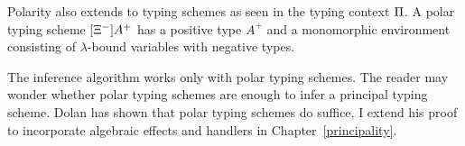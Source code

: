 
Polarity also extends to typing schemes as seen in the typing context $\Pi$. A polar typing scheme $[\Xi^-]A^+$ has a positive type $A^+$ and a monomorphic environment consisting of $\lambda$-bound variables with negative types. 

The inference algorithm works only with polar typing schemes. The reader may wonder whether polar typing schemes are enough to infer a principal typing scheme. Dolan has shown that polar typing schemes do suffice, I extend his proof to incorporate algebraic effects and handlers in Chapter~\ref{principality}. \cite{dolan2017algebraic}

\begin{figure}[!htb]
\begin{center}
\end{center}
\end{figure}
